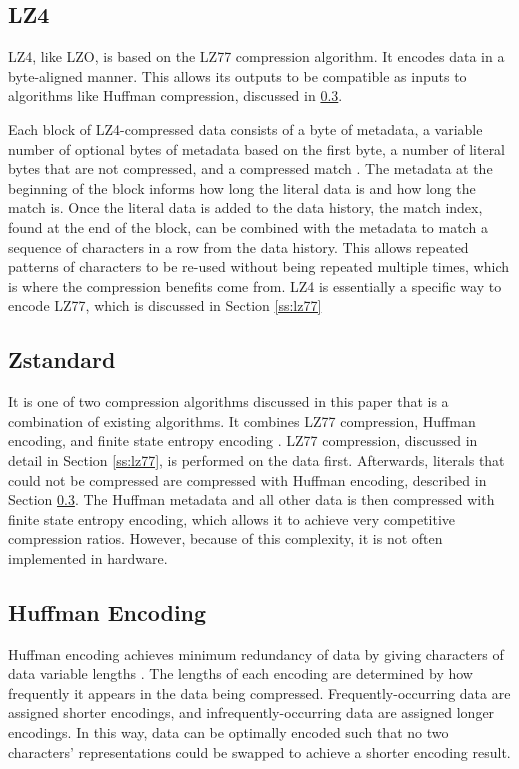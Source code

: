 \documentclass[doublespace,nopageskip]{VTthesis}
\begin{document}
\subsection{LZ4}\label{ss:lz4}
LZ4, like LZO, is based on the LZ77 compression algorithm. It encodes data in a byte-aligned manner. This allows its outputs to be compatible as inputs to algorithms like Huffman compression, discussed in \ref{ss:huffman_encoding}.

Each block of LZ4-compressed data consists of a byte of metadata, a variable number of optional bytes of metadata based on the first byte, a number of literal bytes that are not compressed, and a compressed match \cite{lz4}. The metadata at the beginning of the block informs how long the literal data is and how long the match is. Once the literal data is added to the data history, the match index, found at the end of the block, can be combined with the metadata to match a sequence of characters in a row from the data history. This allows repeated patterns of characters to be re-used without being repeated multiple times, which is where the compression benefits come from. LZ4 is essentially a specific way to encode LZ77, which is discussed in Section \ref{ss:lz77}

\subsection{Zstandard}\label{ss:zstandard}
It is one of two compression algorithms discussed in this paper that is a combination of existing algorithms. It combines LZ77 compression, Huffman encoding, and finite state entropy encoding \cite{zstd}. LZ77 compression, discussed in detail in Section \ref{ss:lz77}, is performed on the data first. Afterwards, literals that could not be compressed are compressed with Huffman encoding, described in Section \ref{ss:huffman_encoding}. The Huffman metadata and all other data is then compressed with finite state entropy encoding, which allows it to achieve very competitive compression ratios. However, because of this complexity, it is not often implemented in hardware. 

\subsection{Huffman Encoding}\label{ss:huffman_encoding}
Huffman encoding achieves minimum redundancy of data by giving characters of data variable lengths \cite{huffman}. The lengths of each encoding are determined by how frequently it appears in the data being compressed. Frequently-occurring data are assigned shorter encodings, and infrequently-occurring data are assigned longer encodings. In this way, data can be optimally encoded such that no two characters' representations could be swapped to achieve a shorter encoding result. 
\end{document}
